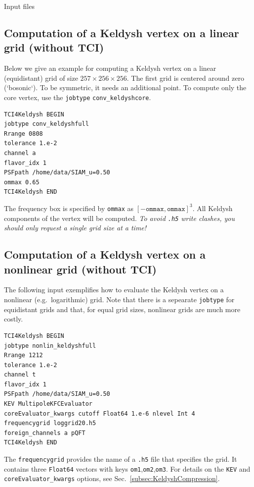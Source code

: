 \documentclass[12pt]{article}
\begin{document}
\begin{section}{Input files}
\subsection{Computation of a Keldysh vertex on a linear grid (without TCI)}
Below we give an example for computing a Keldysh vertex on a linear (equidistant) grid of size
$257\times256\times256$. The first grid is centered around zero (`bosonic`). To be symmetric, it needs an additional point.
To compute only the core vertex, use the \texttt{jobtype} \texttt{conv\_keldyshcore}.
\begin{verbatim}
TCI4Keldysh BEGIN
jobtype conv_keldyshfull
Rrange 0808
tolerance 1.e-2
channel a
flavor_idx 1
PSFpath /home/data/SIAM_u=0.50
ommax 0.65
TCI4Keldysh END 
\end{verbatim}
The frequency box is specified by \texttt{ommax} as $[-\texttt{ommax},\texttt{ommax}]^3$.
All Keldysh components of the vertex will be computed.
\textit{To avoid \texttt{.h5} write clashes, you should only request a single grid size at a time!}

\subsection{Computation of a Keldysh vertex on a nonlinear grid (without TCI)}
The following input exemplifies how to evaluate the Keldysh vertex on a nonlinear (e.g.\ logarithmic) grid.
Note that there is a sepearate \texttt{jobtype} for equidistant grids and that, for equal grid sizes,
nonlinear grids are much more costly.
\begin{verbatim}
TCI4Keldysh BEGIN
jobtype nonlin_keldyshfull
Rrange 1212
tolerance 1.e-2
channel t
flavor_idx 1
PSFpath /home/data/SIAM_u=0.50
KEV MultipoleKFCEvaluator
coreEvaluator_kwargs cutoff Float64 1.e-6 nlevel Int 4
frequencygrid loggrid20.h5
foreign_channels a pQFT
TCI4Keldysh END 
\end{verbatim}
The \texttt{frequencygrid} provides the name of a \texttt{.h5} file that specifies the
grid. It contains three \texttt{Float64} vectors with keys \texttt{om1},\texttt{om2},\texttt{om3}.
For details on the \texttt{KEV} and \texttt{coreEvaluator\_kwargs} options, see Sec.\ \ref{subsec:KeldyshCompression}.
\end{section}
\end{document}
